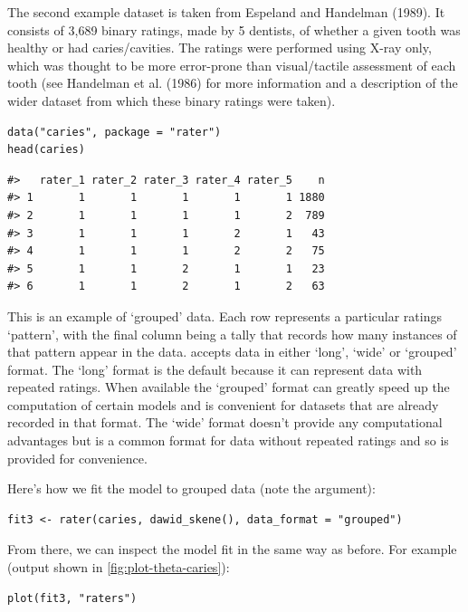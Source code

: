 The second example dataset is taken from Espeland and Handelman (1989). It consists of
3,689 binary ratings, made by 5 dentists, of whether a given tooth was healthy
or had caries/cavities. The ratings were performed using X-ray
only, which was thought to be more error-prone than visual/tactile assessment
of each tooth (see Handelman et al. (1986) for more information and a description
of the wider dataset from which these binary ratings were taken).

\begin{verbatim}
data("caries", package = "rater")
head(caries)
\end{verbatim}

\begin{verbatim}
#>   rater_1 rater_2 rater_3 rater_4 rater_5    n
#> 1       1       1       1       1       1 1880
#> 2       1       1       1       1       2  789
#> 3       1       1       1       2       1   43
#> 4       1       1       1       2       2   75
#> 5       1       1       2       1       1   23
#> 6       1       1       2       1       2   63
\end{verbatim}

This is an example of `grouped' data. Each row represents a particular ratings
`pattern', with the final column being a tally that records how many instances
of that pattern appear in the data.  accepts data in either
`long', `wide' or `grouped' format. The `long' format is the default because
it can represent data with repeated ratings. When available the `grouped'
format can greatly speed up the computation of certain models and is convenient
for datasets that are already
recorded in that format. The `wide' format doesn't provide any computational
advantages but is a common format for data without repeated ratings and so is
provided for convenience.

Here's how we fit the model to grouped data (note the 
argument):

\begin{verbatim}
fit3 <- rater(caries, dawid_skene(), data_format = "grouped")
\end{verbatim}

From there, we can inspect the model fit in the same way as before. For
example (output shown in \autoref{fig:plot-theta-caries}):

\begin{verbatim}
plot(fit3, "raters")
\end{verbatim}

